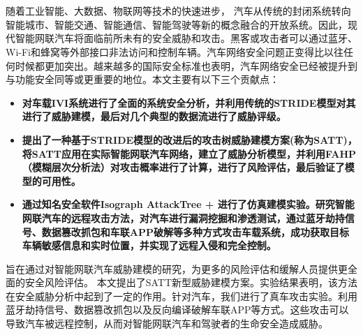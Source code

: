 \vspace{-2.5cm}
\chapter*{\xiaosan {}}
\hspace{-0.5cm}

随着工业智能、大数据、物联网等技术的快速进步，
汽车从传统的封闭系统转向智能城市、智能交通、智能通信、智能驾驶等新的概念融合的开放系统。因此，现代智能网联汽车将面临前所未有的安全威胁和攻击。黑客或攻击者可以通过蓝牙、Wi-Fi和蜂窝等外部接口非法访问和控制车辆。汽车网络安全问题正变得比以往任何时候都更加突出。越来越多的国际安全标准也表明，汽车网络安全已经被提升到与功能安全同等或更重要的地位。本文主要有以下三个贡献点：
\begin{itemize}
    \item \textbf{对车载IVI系统进行了全面的系统安全分析，并利用传统的STRIDE模型对其进行了威胁建模，最后对几个典型的数据流进行了威胁评级。}
    \item \textbf{提出了一种基于STRIDE模型的改进后的攻击树威胁建模方案(称为SATT)，将SATT应用在实际智能网联汽车网络，建立了威胁分析模型，并利用FAHP（模糊层次分析法）对攻击概率进行了计算，进行了风险评估，最后验证了模型的可用性。}
    \item \textbf{通过知名安全软件Isograph AttackTree + 进行了仿真建模实验。研究智能网联汽车的远程攻击方法，对汽车进行漏洞挖掘和渗透测试，通过蓝牙劫持信号、数据篡改抓包和车联APP破解等多种方式攻击车载系统，成功获取目标车辆敏感信息和实时位置，并实现了远程入侵和完全控制。}    
\end{itemize}

旨在通过对智能网联汽车威胁建模的研究，为更多的风险评估和缓解人员提供更全面的安全风险评估。
本文提出了SATT新型威胁建模方案。实验结果表明，该方法在安全威胁分析中起到了一定的作用。针对汽车，我们进行了真车攻击实验。利用蓝牙劫持信号、数据篡改抓包以及反向编译破解车联APP等方式。这些攻击可以导致汽车被远程控制，从而对智能网联汽车和驾驶者的生命安全造成威胁。
\newline
{} 